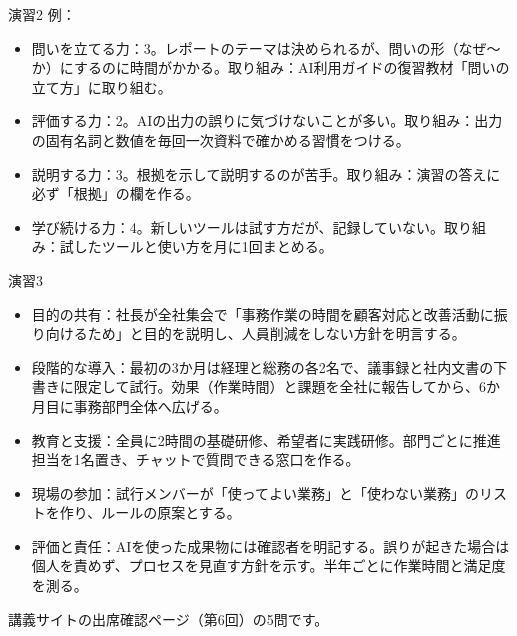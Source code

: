 \begin{answer}{演習2}
例：
\begin{itemize}
  \item 問いを立てる力：3。レポートのテーマは決められるが、問いの形（なぜ〜か）にするのに時間がかかる。取り組み：AI利用ガイドの復習教材「問いの立て方」に取り組む。
  \item 評価する力：2。AIの出力の誤りに気づけないことが多い。取り組み：出力の固有名詞と数値を毎回一次資料で確かめる習慣をつける。
  \item 説明する力：3。根拠を示して説明するのが苦手。取り組み：演習の答えに必ず「根拠」の欄を作る。
  \item 学び続ける力：4。新しいツールは試す方だが、記録していない。取り組み：試したツールと使い方を月に1回まとめる。
\end{itemize}
\end{answer}

\begin{answer}{演習3}
\begin{itemize}
  \item 目的の共有：社長が全社集会で「事務作業の時間を顧客対応と改善活動に振り向けるため」と目的を説明し、人員削減をしない方針を明言する。
  \item 段階的な導入：最初の3か月は経理と総務の各2名で、議事録と社内文書の下書きに限定して試行。効果（作業時間）と課題を全社に報告してから、6か月目に事務部門全体へ広げる。
  \item 教育と支援：全員に2時間の基礎研修、希望者に実践研修。部門ごとに推進担当を1名置き、チャットで質問できる窓口を作る。
  \item 現場の参加：試行メンバーが「使ってよい業務」と「使わない業務」のリストを作り、ルールの原案とする。
  \item 評価と責任：AIを使った成果物には確認者を明記する。誤りが起きた場合は個人を責めず、プロセスを見直す方針を示す。半年ごとに作業時間と満足度を測る。
\end{itemize}
\end{answer}

講義サイトの出席確認ページ（第6回）の5問です。

